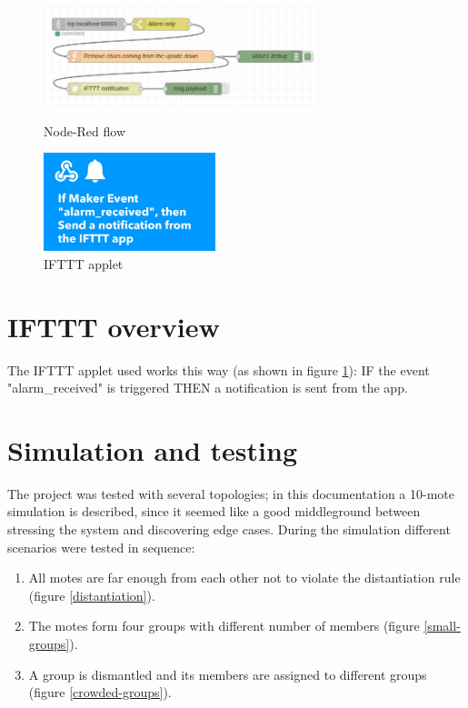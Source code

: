 \documentclass[11pt]{article}
\begin{document}
\begin{figure}[H]
  \begin{minipage}{0.6\textwidth}
    \includegraphics[height=108px]{Node-red-flow}
    \caption{Node-Red flow}
    \label{nodered}
  \end{minipage}
  \begin{minipage}{0.39\textwidth}
    \includegraphics[height=108px]{ifttt-screenshot}
    \caption{IFTTT applet}
    \label{ifttt}
  \end{minipage}
\end{figure}

\section{IFTTT overview}
The IFTTT applet used works this way (as shown in figure \ref{ifttt}): \newline
IF the event "alarm\_received" is triggered \newline
THEN a notification is sent from the app.

\section{Simulation and testing}
The project was tested with several topologies; in this documentation a 10-mote simulation is described, since it seemed like a good middleground between stressing the system and discovering edge cases. \newline
During the simulation different scenarios were tested in sequence:
\begin{enumerate}
  \item All motes are far enough from each other not to violate the distantiation rule (figure \ref{distantiation}).
  \item The motes form four groups with different number of members (figure \ref{small-groups}).
  \item A group is dismantled and its members are assigned to different groups (figure \ref{crowded-groups}).
\end{enumerate}
\end{document}
